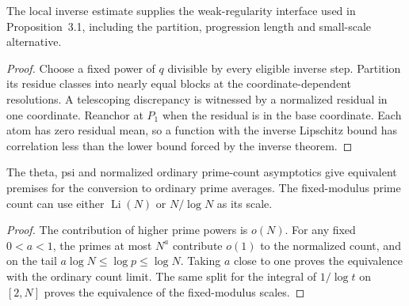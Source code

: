 \begin{lemma}\label{checked-weak-regularity}
\leanok
The local inverse estimate supplies the weak-regularity interface
used in Proposition~3.1, including the partition, progression length
and small-scale alternative.
\end{lemma}
\begin{proof}
\leanok
Choose a fixed power of $q$ divisible by every eligible inverse step.
Partition its residue classes into nearly equal blocks at the
coordinate-dependent resolutions. A telescoping discrepancy is witnessed
by a normalized residual in one coordinate. Reanchor at $P_1$ when
the residual is in the base coordinate. Each atom has zero residual
mean, so a function with the inverse Lipschitz bound has correlation
less than the lower bound forced by the inverse theorem.
\end{proof}

\begin{lemma}\label{checked-prime-normalization}
\leanok
The theta, psi and normalized ordinary prime-count asymptotics give
equivalent premises for the conversion to ordinary prime averages.
The fixed-modulus prime count can use either $\operatorname{Li}(N)$
or $N/\log N$ as its scale.
\end{lemma}
\begin{proof}
\leanok
The contribution of higher prime powers is $o(N)$. For any fixed
$0<a<1$, the primes at most $N^a$ contribute $o(1)$ to the normalized
count, and on the tail $a\log N\le\log p\le\log N$. Taking $a$ close
to one proves the equivalence with the ordinary count limit.
The same split for the integral of $1/\log t$ on $[2,N]$ proves the
equivalence of the fixed-modulus scales.
\end{proof}

